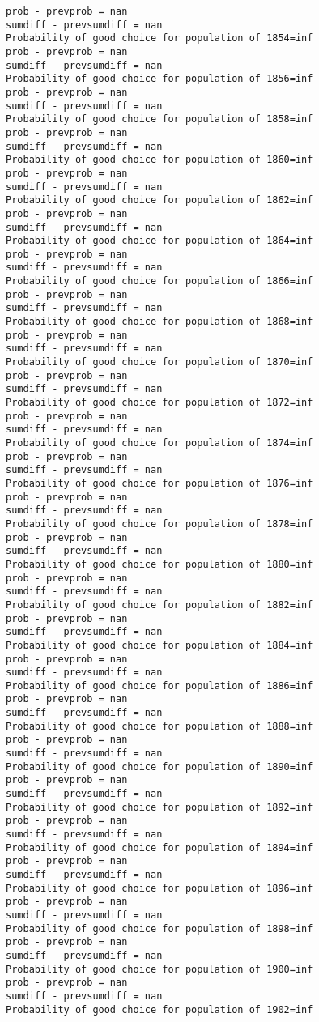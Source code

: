 \documentclass[11pt,onecolumn]{article}
\begin{document}
\begin{verbatim}
prob - prevprob = nan
sumdiff - prevsumdiff = nan
Probability of good choice for population of 1854=inf
prob - prevprob = nan
sumdiff - prevsumdiff = nan
Probability of good choice for population of 1856=inf
prob - prevprob = nan
sumdiff - prevsumdiff = nan
Probability of good choice for population of 1858=inf
prob - prevprob = nan
sumdiff - prevsumdiff = nan
Probability of good choice for population of 1860=inf
prob - prevprob = nan
sumdiff - prevsumdiff = nan
Probability of good choice for population of 1862=inf
prob - prevprob = nan
sumdiff - prevsumdiff = nan
Probability of good choice for population of 1864=inf
prob - prevprob = nan
sumdiff - prevsumdiff = nan
Probability of good choice for population of 1866=inf
prob - prevprob = nan
sumdiff - prevsumdiff = nan
Probability of good choice for population of 1868=inf
prob - prevprob = nan
sumdiff - prevsumdiff = nan
Probability of good choice for population of 1870=inf
prob - prevprob = nan
sumdiff - prevsumdiff = nan
Probability of good choice for population of 1872=inf
prob - prevprob = nan
sumdiff - prevsumdiff = nan
Probability of good choice for population of 1874=inf
prob - prevprob = nan
sumdiff - prevsumdiff = nan
Probability of good choice for population of 1876=inf
prob - prevprob = nan
sumdiff - prevsumdiff = nan
Probability of good choice for population of 1878=inf
prob - prevprob = nan
sumdiff - prevsumdiff = nan
Probability of good choice for population of 1880=inf
prob - prevprob = nan
sumdiff - prevsumdiff = nan
Probability of good choice for population of 1882=inf
prob - prevprob = nan
sumdiff - prevsumdiff = nan
Probability of good choice for population of 1884=inf
prob - prevprob = nan
sumdiff - prevsumdiff = nan
Probability of good choice for population of 1886=inf
prob - prevprob = nan
sumdiff - prevsumdiff = nan
Probability of good choice for population of 1888=inf
prob - prevprob = nan
sumdiff - prevsumdiff = nan
Probability of good choice for population of 1890=inf
prob - prevprob = nan
sumdiff - prevsumdiff = nan
Probability of good choice for population of 1892=inf
prob - prevprob = nan
sumdiff - prevsumdiff = nan
Probability of good choice for population of 1894=inf
prob - prevprob = nan
sumdiff - prevsumdiff = nan
Probability of good choice for population of 1896=inf
prob - prevprob = nan
sumdiff - prevsumdiff = nan
Probability of good choice for population of 1898=inf
prob - prevprob = nan
sumdiff - prevsumdiff = nan
Probability of good choice for population of 1900=inf
prob - prevprob = nan
sumdiff - prevsumdiff = nan
Probability of good choice for population of 1902=inf

\end{verbatim}
\end{document}
